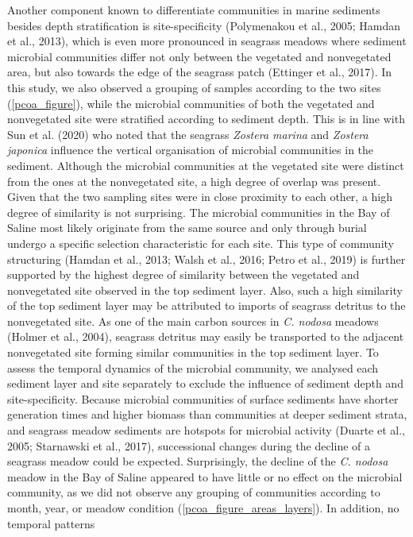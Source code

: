 \documentclass[12pt,]{article}
\begin{document}
Another component known to differentiate communities in marine sediments
besides depth stratification is site-specificity (Polymenakou et al.,
2005; Hamdan et al., 2013), which is even more pronounced in seagrass
meadows where sediment microbial communities differ not only between the
vegetated and nonvegetated area, but also towards the edge of the
seagrass patch (Ettinger et al., 2017). In this study, we also observed
a grouping of samples according to the two sites
(\autoref{pcoa_figure}), while the microbial communities of both the
vegetated and nonvegetated site were stratified according to sediment
depth. This is in line with Sun et al. (2020) who noted that the
seagrass \emph{Zostera marina} and \emph{Zostera japonica} influence the
vertical organisation of microbial communities in the sediment. Although
the microbial communities at the vegetated site were distinct from the
ones at the nonvegetated site, a high degree of overlap was present.
Given that the two sampling sites were in close proximity to each other,
a high degree of similarity is not surprising. The microbial communities
in the Bay of Saline most likely originate from the same source and only
through burial undergo a specific selection characteristic for each
site. This type of community structuring (Hamdan et al., 2013; Walsh et
al., 2016; Petro et al., 2019) is further supported by the highest
degree of similarity between the vegetated and nonvegetated site
observed in the top sediment layer. Also, such a high similarity of the
top sediment layer may be attributed to imports of seagrass detritus to
the nonvegetated site. As one of the main carbon sources in \emph{C.
nodosa} meadows (Holmer et al., 2004), seagrass detritus may easily be
transported to the adjacent nonvegetated site forming similar
communities in the top sediment layer. To assess the temporal dynamics
of the microbial community, we analysed each sediment layer and site
separately to exclude the influence of sediment depth and
site-specificity. Because microbial communities of surface sediments
have shorter generation times and higher biomass than communities at
deeper sediment strata, and seagrass meadow sediments are hotspots for
microbial activity (Duarte et al., 2005; Starnawski et al., 2017),
successional changes during the decline of a seagrass meadow could be
expected. Surprisingly, the decline of the \emph{C. nodosa} meadow in
the Bay of Saline appeared to have little or no effect on the microbial
community, as we did not observe any grouping of communities according
to month, year, or meadow condition
(\autoref{pcoa_figure_areas_layers}). In addition, no temporal patterns
\end{document}
